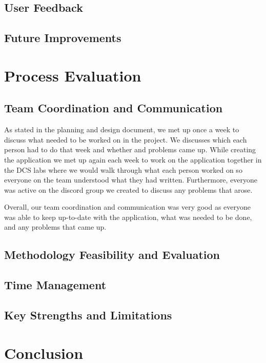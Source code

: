 \documentclass{article}
\begin{document}
    \subsection{User Feedback}

    \subsection{Future Improvements}

\section{Process Evaluation}

    \subsection{Team Coordination and Communication}
    As stated in the planning and design document, we met up once a week to discuss what needed to be worked on in the project. We discusses which each person had to do that week and whether and problems came up. While creating the application we met up again each week to work on the application together in the DCS labs where we would walk through what each person worked on so everyone on the team understood what they had written. Furthermore, everyone was active on the discord group we created to discuss any problems that arose.

    Overall, our team coordination and communication was very good as everyone was able to keep up-to-date with the application, what was needed to be done, and any problems that came up.

    \subsection{Methodology Feasibility and Evaluation}

    \subsection{Time Management}

    \subsection{Key Strengths and Limitations}

\section{Conclusion}
\end{document}
